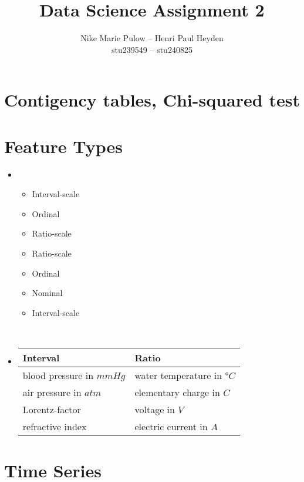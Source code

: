 

\newcommand{\nr}{2}
\title{Data Science Assignment \nr}
\author{Nike Marie Pulow -- Henri Paul Heyden \\ \small stu239549 -- stu240825}
\date{}


    \maketitle
    \section{Contigency tables, Chi-squared test}
    \section{Feature Types}
    \begin{itemize}
        \item[1.]
            \begin{itemize}
                \item Interval-scale
                \item Ordinal
                \item Ratio-scale
                \item Ratio-scale
                \item Ordinal
                \item Nominal
                \item Interval-scale
            \end{itemize} \gap \\
        \item[2.]
            \begin{tabular}{| l l |}
                \hline
                Interval & Ratio \\
                \hline
                blood pressure in \(mmHg\) & water temperature in \(°C\) \\
                air pressure in \(atm\) & elementary charge in \(C\) \\
                Lorentz-factor & voltage in \(V\) \\
                refractive index & electric current in \(A\) \\
                \hline
            \end{tabular}
    \end{itemize}
    \section{Time Series}

